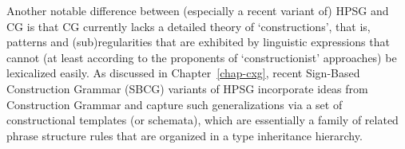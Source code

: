 \documentclass[output=paper]{langsci/langscibook}
\begin{document}



Another notable difference between (especially a recent variant of)
HPSG and CG is that CG currently lacks a detailed theory of
`constructions', 
that is, patterns and (sub)regularities that are
exhibited by linguistic expressions that cannot (at least according to
the proponents of `constructionist' approaches) be lexicalized easily.
As discussed in Chapter~\ref{chap-cxg},  recent Sign-Based Construction
Grammar (SBCG) variants of HPSG \citep{SBK2012a} 
incorporate ideas from Construction Grammar \citep{Goldberg95a} and capture such
generalizations via a set of constructional templates (or schemata),
which are essentially a family of related phrase structure rules that
are organized in a type inheritance hierarchy.
\end{document}
